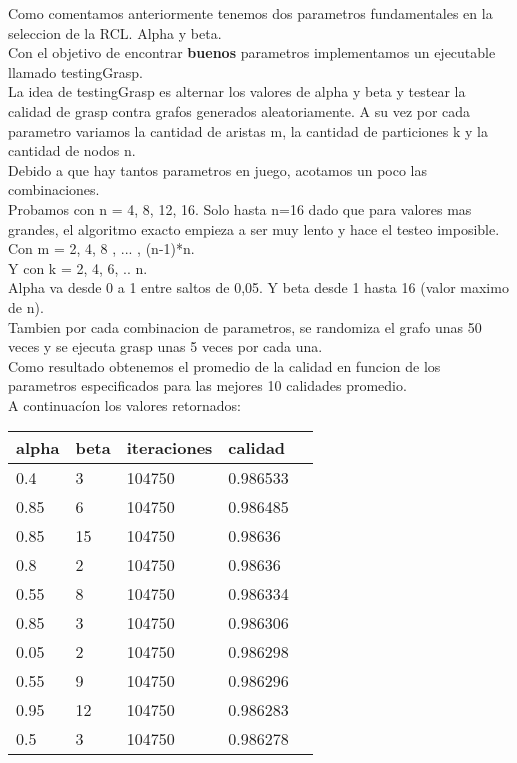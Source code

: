 Como comentamos anteriormente tenemos dos parametros fundamentales en la seleccion de la RCL. Alpha y beta.  \\
Con el objetivo de encontrar \textbf{buenos} parametros implementamos un ejecutable llamado testingGrasp. \\ 
La idea de testingGrasp es alternar los valores de alpha y beta y testear la calidad de grasp contra grafos generados aleatoriamente. A su vez por cada parametro variamos la cantidad de aristas m, la cantidad de particiones k y la cantidad de nodos n. \\ 
Debido a que hay tantos parametros en juego, acotamos un poco las combinaciones.  \\ 
Probamos con n = 4, 8, 12, 16. Solo hasta n=16 dado que para valores mas grandes, el algoritmo exacto empieza a ser muy lento y hace el testeo imposible. \\ 
Con m = 2, 4, 8 , ... , (n-1)*n.  \\ 
Y con k = 2, 4, 6, .. n. \\ 
Alpha va desde 0 a 1 entre saltos de 0,05. Y beta desde 1 hasta 16 (valor maximo de n). \\ 
Tambien por cada combinacion de parametros, se randomiza el grafo unas 50 veces y se ejecuta grasp unas 5 veces por cada una. \\ 
Como resultado obtenemos el promedio de la calidad en funcion de los parametros especificados para las mejores 10 calidades promedio. \\ 
A continuacíon los valores retornados: \\ 



\noindent
\begin{tabular}[t]{|l |l |l |l |l|}
\hline
alpha & beta & iteraciones & calidad \\
\hline
0.4 & 3 & 104750 & 0.986533 \\
\hline
0.85 & 6 & 104750 & 0.986485 \\
\hline
0.85 & 15 & 104750 & 0.98636 \\
\hline
0.8 & 2 & 104750 & 0.98636 \\
\hline
0.55 & 8 & 104750 & 0.986334 \\
\hline
0.85 & 3 & 104750 & 0.986306 \\
\hline
0.05 & 2 & 104750 & 0.986298 \\
\hline
0.55 & 9 & 104750 & 0.986296 \\
\hline
0.95 & 12 & 104750 & 0.986283 \\
\hline
0.5 &  3 & 104750 & 0.986278 \\
\hline
\end{tabular}
\bigskip


